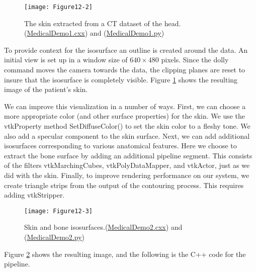 \begin{figure}[!htb]
    \centering
    \texttt{[image: Figure12-2]}
    \caption{The skin extracted from a CT dataset of the head.(\href{https://lorensen.github.io/VTKExamples/site/Cxx/Medical/MedicalDemo1/}{MedicalDemo1.cxx}) and (\href{https://lorensen.github.io/VTKExamples/site/Python/Medical/MedicalDemo1/}{MedicalDemo1.py})}
    \label{fig:Figure12-2}
\end{figure}

\noindent To provide context for the isosurface an outline is created around the data. An initial view is set up  in a window size of $640 \times 480$ pixels. Since the dolly command moves the camera towards the data, the clipping planes are reset to insure that the isosurface is
completely visible. Figure \ref{fig:Figure12-2} shows the resulting image of the patient's skin.

We can improve this visualization in a number of ways. First, we can choose a more appropriate color (and other surface properties) for the skin. We use the vtkProperty method SetDiffuseColor() to set the skin color to a fleshy tone. We also add a specular component to the skin surface. Next, we can add additional isosurfaces corresponding to various anatomical features. Here we choose to extract the bone surface by adding an additional pipeline segment. This consists of the filters vtkMarchingCubes, vtkPolyDataMapper, and vtkActor, just as we did with the skin. Finally, to improve rendering performance on our system, we create triangle strips from the output of the contouring process. This requires adding vtkStripper.

\begin{figure}[!htb]
    \centering
    \texttt{[image: Figure12-3]}
    \caption{Skin and bone isosurfaces.(\href{https://lorensen.github.io/VTKExamples/site/Cxx/Medical/MedicalDemo2/}{MedicalDemo2.cxx}) and (\href{https://lorensen.github.io/VTKExamples/site/Python/Medical/MedicalDemo2/}{MedicalDemo2.py})}
    \label{fig:Figure12-3}
\end{figure}

Figure \ref{fig:Figure12-3} shows the resulting image, and the following is the C++ code for the pipeline.

